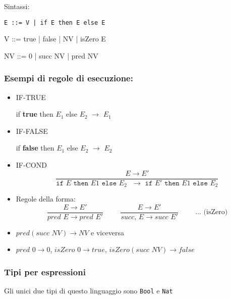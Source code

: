 \documentclass[a4paper,10pt]{article}
\begin{document}
Sintassi:
 \begin{center}
  \tt E ::= V | if E then E else E
  
  V ::= true | false | NV | isZero E
  
  NV ::= 0 | succ NV | pred NV
 \end{center}


\subsubsection{Esempi di regole di esecuzione:}
\begin{itemize}


\tt 
 \item IF-TRUE
 
 \begin{center}
  if \textbf{true} then $E_1$ else $E_2$ $\to$ $E_1$
 \end{center}

 \item IF-FALSE 
 
 \begin{center}if \textbf{false} then $E_1$ else $E_2$ $\to$ $E_2$ 
 \end{center}

 \item IF-COND \[\dfrac{E \to E'}{\texttt{if $E$ then $E1$ else $E_2$ $\to $ if $E'$ then $E1$ else $E_2$}}\]
 
\item \textrm{Regole della forma:}
\[\dfrac{E \to E'}{pred\,\,E \to pred\,\,E'} \hspace{1cm}\dfrac{E \to E'}{succ,\,E \to succ\,\,E'} \hspace{1cm }\textrm{... (isZero)}\]
\item $pred(succ\,\, NV) \to NV$ \textrm{e viceversa}
\item $pred\,\, 0 \to 0$, $isZero\,\, 0 \to true$, $isZero( succ\,\,NV) \to false$
\end{itemize}
\newpage
\subsubsection{Tipi per espressioni}

Gli unici due tipi di questo linguaggio sono \texttt{Bool} e \texttt{Nat}
\end{document}

